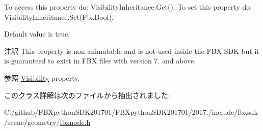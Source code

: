 To access this property do\+: Visibility\+Inheritance.\+Get(). To set this property do\+: Visibility\+Inheritance.\+Set(\+Fbx\+Bool).

Default value is {\ttfamily true}. \begin{DoxyRemark}{注釈}
This property is non-\/animatable and is not used inside the F\+BX S\+DK but it is guaranteed to exist in F\+BX files with version 7. and above. 
\end{DoxyRemark}
\begin{DoxySeeAlso}{参照}
\hyperlink{class_fbx_node_a9f02f0a70b81c1a656137def3e34edb7}{Visibility} property. 
\end{DoxySeeAlso}


このクラス詳解は次のファイルから抽出されました\+:\begin{DoxyCompactItemize}
\item 
C\+:/github/\+F\+B\+Xpython\+S\+D\+K201701/\+F\+B\+Xpython\+S\+D\+K201701/2017./include/fbxsdk/scene/geometry/\hyperlink{fbxnode_8h}{fbxnode.\+h}\end{DoxyCompactItemize}
